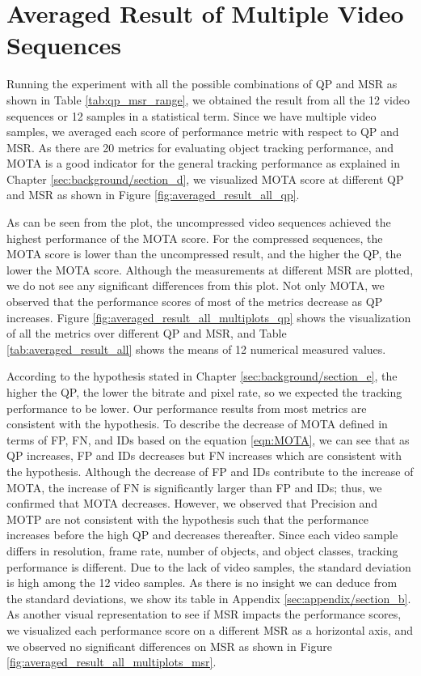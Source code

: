 \section{Averaged Result of Multiple Video Sequences}
\label{sec:results/section_a}

Running the experiment with all the possible combinations of QP and MSR as shown in Table \ref{tab:qp_msr_range}, we obtained the result from all the 12 video sequences or 12 samples in a statistical term. Since we have multiple video samples, we averaged each score of performance metric with respect to QP and MSR. As there are 20 metrics for evaluating object tracking performance, and MOTA is a good indicator for the general tracking performance as explained in Chapter \ref{sec:background/section_d}, we visualized MOTA score at different QP and MSR as shown in Figure \ref{fig:averaged_result_all_qp}.

As can be seen from the plot, the uncompressed video sequences achieved the highest performance of the MOTA score. For the compressed sequences, the MOTA score is lower than the uncompressed result, and the higher the QP, the lower the MOTA score. Although the measurements at different MSR are plotted, we do not see any significant differences from this plot. Not only MOTA, we observed that the performance scores of most of the metrics decrease as QP increases. Figure \ref{fig:averaged_result_all_multiplots_qp} shows the visualization of all the metrics over different QP and MSR, and Table \ref{tab:averaged_result_all} shows the means of 12 numerical measured values.


According to the hypothesis stated in Chapter \ref{sec:background/section_e}, the higher the QP, the lower the bitrate and pixel rate, so we expected the tracking performance to be lower. Our performance results from most metrics are consistent with the hypothesis. To describe the decrease of MOTA defined in terms of FP, FN, and IDs based on the equation \ref{eqn:MOTA}, we can see that as QP increases, FP and IDs decreases but FN increases which are consistent with the hypothesis. Although the decrease of FP and IDs contribute to the increase of MOTA, the increase of FN is significantly larger than FP and IDs; thus, we confirmed that MOTA decreases. However, we observed that Precision and MOTP are not consistent with the hypothesis such that the performance increases before the high QP and decreases thereafter. Since each video sample differs in resolution, frame rate, number of objects, and object classes, tracking performance is different. Due to the lack of video samples, the standard deviation is high among the 12 video samples. As there is no insight we can deduce from the standard deviations, we show its table in Appendix \ref{sec:appendix/section_b}. As another visual representation to see if MSR impacts the performance scores, we visualized each performance score on a different MSR as a horizontal axis, and we observed no significant differences on MSR as shown in Figure \ref{fig:averaged_result_all_multiplots_msr}.
